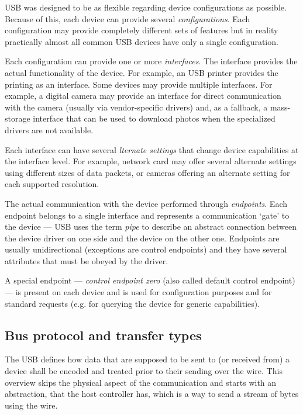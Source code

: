 USB was designed to be as flexible regarding device configurations as possible.
Because of this, each device can provide several \textit{configurations}. Each
configuration may provide completely different sets of features but in reality
practically almost all common USB devices have only a single configuration.

Each configuration can provide one or more \textit{interfaces}. The interface
provides the actual functionality of the device. For example, an USB printer
provides the printing as an interface. Some devices may provide multiple
interfaces. For example, a digital camera may provide an interface for direct
communication with the camera (usually via vendor-specific drivers) and, as a
fallback, a mass-storage interface that can be used to download photos when the
specialized drivers are not available.

Each interface can have several \textit{lternate settings} that change device
capabilities at the interface level. For example, network card may offer
several alternate settings using different sizes of data packets, or cameras
offering an alternate setting for each supported resolution.

The actual communication with the device performed through \textit{endpoints}.
Each endpoint belongs to a single interface and represents a communication
‘gate’ to the device — USB uses the term \textit{pipe} to describe an abstract
connection between the device driver on one side and the device on the other
one. Endpoints are usually unidirectional (exceptions are control endpoints)
and they have several attributes that must be obeyed by the driver.

A special endpoint — \textit{control endpoint zero} (also called default
control endpoint) — is present on each device and is used for configuration
purposes and for standard requests (e.g. for querying the device for
generic capabilities).

\subsection{Bus protocol and transfer types}

The USB defines how data that are supposed to be sent to (or received from) a
device shall be encoded and treated prior to their sending over the wire. This
overview skips the physical aspect of the communication and starts with an
abstraction, that the host controller has, which is a way to send a stream of
bytes using the wire.

